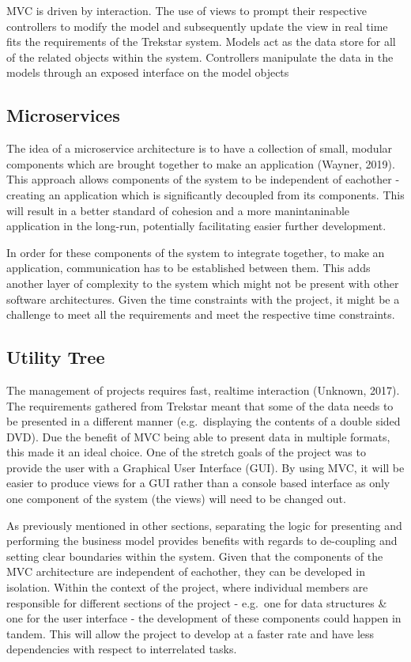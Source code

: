 \documentclass[
  english,
  a4paper,
,tablecaptionabove
]{scrartcl}
\begin{document}
MVC is driven by interaction. The use of views to prompt their
respective controllers to modify the model and subsequently update the
view in real time fits the requirements of the Trekstar system. Models
act as the data store for all of the related objects within the system.
Controllers manipulate the data in the models through an exposed
interface on the model objects

\hypertarget{microservices}{%
\subsection{Microservices}\label{microservices}}

The idea of a microservice architecture is to have a collection of
small, modular components which are brought together to make an
application (Wayner, 2019). This approach allows components of the
system to be independent of eachother - creating an application which is
significantly decoupled from its components. This will result in a
better standard of cohesion and a more manintaninable application in the
long-run, potentially facilitating easier further development.

In order for these components of the system to integrate together, to
make an application, communication has to be established between them.
This adds another layer of complexity to the system which might not be
present with other software architectures. Given the time constraints
with the project, it might be a challenge to meet all the requirements
and meet the respective time constraints.

\hypertarget{utility-tree}{%
\subsection{Utility Tree}\label{utility-tree}}

The management of projects requires fast, realtime interaction (Unknown,
2017). The requirements gathered from Trekstar meant that some of the
data needs to be presented in a different manner (e.g.~displaying the
contents of a double sided DVD). Due the benefit of MVC being able to
present data in multiple formats, this made it an ideal choice. One of
the stretch goals of the project was to provide the user with a
Graphical User Interface (GUI). By using MVC, it will be easier to
produce views for a GUI rather than a console based interface as only
one component of the system (the views) will need to be changed out.

As previously mentioned in other sections, separating the logic for
presenting and performing the business model provides benefits with
regards to de-coupling and setting clear boundaries within the system.
Given that the components of the MVC architecture are independent of
eachother, they can be developed in isolation. Within the context of the
project, where individual members are responsible for different sections
of the project - e.g.~one for data structures \& one for the user
interface - the development of these components could happen in tandem.
This will allow the project to develop at a faster rate and have less
dependencies with respect to interrelated tasks.
\end{document}

